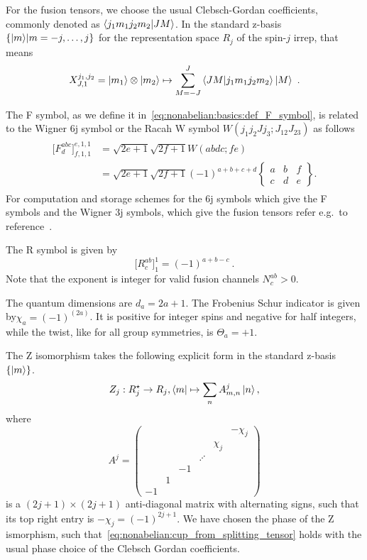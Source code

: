 For the fusion tensors, we choose the usual Clebsch-Gordan coefficients, commonly denoted as $\braket{j_1 m_1 j_2 m_2}{J M}$.
%
In the standard z-basis $\setdef{\ket{m}}{m = -j, \dots, j}$ for the representation space $R_j$ of the spin-$j$ irrep, that means
\begin{equation}
    X^{j_1,j_2}_{J,1} = \ket{m_1} \otimes \ket{m_2} \mapsto \sum_{M=-J}^J \braket{J M}{j_1 m_1 j_2 m_2} \ket{M}
    ~.
\end{equation}

The F symbol, as we define it in~\eqref{eq:nonabelian:basics:def_F_symbol}, is related to the Wigner 6j symbol or the Racah W symbol $W(j_1 j_2 J j_3; J_{12} J_{23})$ as follows
\begin{align}
    \begin{split}  
        \big[ F^{abc}_d \big]^{e,1,1}_{f,1,1} 
        &= \sqrt{2 e + 1} \sqrt{2 f + 1} W(a b d c; f e)
        \\
        &= \sqrt{2 e + 1} \sqrt{2 f + 1} (-1)^{a+b+c+d}
            \begin{Bmatrix} a & b & f \\ c & d & e \end{Bmatrix}
        .
    \end{split}
\end{align}
%
For computation and storage schemes for the 6j symbols which give the F symbols and the Wigner 3j symbols, which give the fusion tensors refer e.g.~to reference~\cite{rasch2004}.

%
The R symbol is given by
\begin{equation}
    \big[ R^{ab}_c \big]^1_1 = (-1)^{a + b - c}
    ~.
\end{equation}
Note that the exponent is integer for valid fusion channels $N^{ab}_c > 0$.

The quantum dimensions are $d_a = 2a + 1$.
The Frobenius Schur indicator is given by$\chi_a = (-1)^{(2a)}$.
It is positive for integer spins and negative for half integers, while the twist, like for all group symmetries, is $\Theta_a = +1$.

The Z isomorphism takes the following explicit form in the standard z-basis $\set{\ket{m}}$.
\begin{equation}
    Z_j : \dualspace{R_j} \to R_j , \bra{m} \mapsto \sum_n A^j_{m, n} \ket{n}
    ,
\end{equation}
where
\begin{equation}
    A^j = \begin{pmatrix}
        & & & & & -\chi_j \\
        & & & & \chi_j & \\
        & & & \iddots & & \\
        & & -1 & & & \\
        & 1 & & & & \\
        -1 & & & & &
    \end{pmatrix}
\end{equation}
is a $(2j + 1) \times (2j + 1)$ anti-diagonal matrix with alternating signs, such that its top right entry is $-\chi_j = (-1)^{2j+1}$.
%
We have chosen the phase of the Z ismorphism, such that~\eqref{eq:nonabelian:cup_from_splitting_tensor} holds with the usual phase choice of the Clebsch Gordan coefficients.

